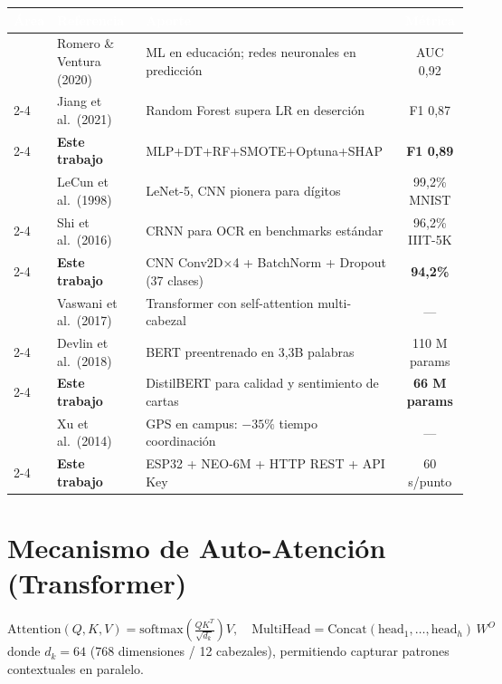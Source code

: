\documentclass[12pt,a4paper,twoside]{report}
\begin{document}
\begin{center}
\begin{tabularx}{\textwidth}{|l|l|X|c|}
\hline
\rowcolor{tableHdr}\textcolor{white}{\textbf{Área}} &
\textcolor{white}{\textbf{Referencia}} &
\textcolor{white}{\textbf{Aporte}} &
\textcolor{white}{\textbf{Métrica}} \\
\hline
\rowcolor{rowOdd}\multirow{3}{*}{ML Educativo} & Romero \& Ventura (2020) & ML en educación; redes neuronales en predicción & AUC 0,92 \\
\cline{2-4}\rowcolor{rowEven} & Jiang et al.\ (2021) & Random Forest supera LR en deserción & F1 0,87 \\
\cline{2-4}\rowcolor{rowOdd} & \textbf{Este trabajo} & MLP+DT+RF+SMOTE+Optuna+SHAP & \textbf{F1 0,89} \\
\hline
\rowcolor{rowEven}\multirow{3}{*}{CNN OCR} & LeCun et al.\ (1998) & LeNet-5, CNN pionera para dígitos & 99,2\% MNIST \\
\cline{2-4}\rowcolor{rowOdd} & Shi et al.\ (2016) & CRNN para OCR en benchmarks estándar & 96,2\% IIIT-5K \\
\cline{2-4}\rowcolor{rowEven} & \textbf{Este trabajo} & CNN Conv2D×4 + BatchNorm + Dropout (37 clases) & \textbf{94,2\%} \\
\hline
\rowcolor{rowOdd}\multirow{3}{*}{Transformer} & Vaswani et al.\ (2017) & Transformer con self-attention multi-cabezal & — \\
\cline{2-4}\rowcolor{rowEven} & Devlin et al.\ (2018) & BERT preentrenado en 3,3B palabras & 110 M params \\
\cline{2-4}\rowcolor{rowOdd} & \textbf{Este trabajo} & DistilBERT para calidad y sentimiento de cartas & \textbf{66 M params} \\
\hline
\rowcolor{rowEven}\multirow{2}{*}{IoT GPS} & Xu et al.\ (2014) & GPS en campus: $-35\%$ tiempo coordinación & — \\
\cline{2-4}\rowcolor{rowOdd} & \textbf{Este trabajo} & ESP32 + NEO-6M + HTTP REST + API Key & 60 s/punto \\
\hline
\end{tabularx}
\end{center}

\section{Mecanismo de Auto-Atención (Transformer)}
\begin{equation}
\text{Attention}(Q,K,V) = \text{softmax}\!\left(\tfrac{QK^T}{\sqrt{d_k}}\right)V, \quad
\text{MultiHead} = \text{Concat}(\text{head}_1,\ldots,\text{head}_h)\,W^O
\end{equation}
donde $d_k = 64$ (768 dimensiones / 12 cabezales), permitiendo capturar patrones contextuales en paralelo.
\end{document}
